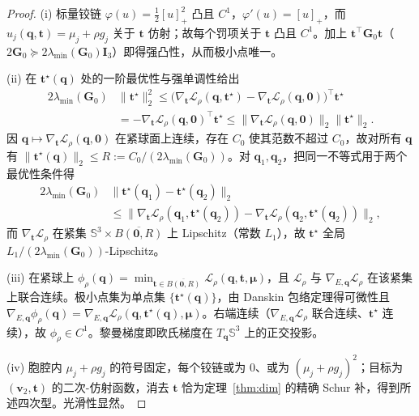 \begin{proof}
(i) 标量铰链 $\varphi(u)=\tfrac12[u]_+^2$ 凸且 $C^1$，$\varphi'(u)=[u]_+$，而 $u_j(\mathbf q,\mathbf t)=\mu_j+\rho g_j$ 关于 $\mathbf t$ 仿射；故每个罚项关于 $\mathbf t$ 凸且 $C^1$。加上 $\mathbf t^\top\mathbf G_0\mathbf t$（$2\mathbf G_0\succeq2\lambda_{\min}(\mathbf G_0)\mathbf I_3$）即得强凸性，从而极小点唯一。

(ii) 在 $\mathbf t^\star(\mathbf q)$ 处的一阶最优性与强单调性给出
\begin{equation}
\begin{aligned}
2\lambda_{\min}(\mathbf G_0)&\|\mathbf t^\star\|_2^2
\le\big(\nabla_{\mathbf t}\mathcal L_\rho(\mathbf q,\mathbf t^\star)-\nabla_{\mathbf t}\mathcal L_\rho(\mathbf q,\mathbf 0)\big)^\top\mathbf t^\star\\
&=-\nabla_{\mathbf t}\mathcal L_\rho(\mathbf q,\mathbf 0)^\top\mathbf t^\star
\le\|\nabla_{\mathbf t}\mathcal L_\rho(\mathbf q,\mathbf 0)\|_2\|\mathbf t^\star\|_2 .
\end{aligned}
\end{equation}
因 $\mathbf q\mapsto\nabla_{\mathbf t}\mathcal L_\rho(\mathbf q,\mathbf 0)$ 在紧球面上连续，存在 $C_0$ 使其范数不超过 $C_0$，故对所有 $\mathbf q$ 有 $\|\mathbf t^\star(\mathbf q)\|_2\le R:=C_0/(2\lambda_{\min}(\mathbf G_0))$。对 $\mathbf q_1,\mathbf q_2$，把同一不等式用于两个最优性条件得
\begin{equation}
\begin{aligned}
2\lambda_{\min}(\mathbf G_0)&\|\mathbf t^\star(\mathbf q_1)-\mathbf t^\star(\mathbf q_2)\|_2\\
&\le\|\nabla_{\mathbf t}\mathcal L_\rho(\mathbf q_1,\mathbf t^\star(\mathbf q_2))
-\nabla_{\mathbf t}\mathcal L_\rho(\mathbf q_2,\mathbf t^\star(\mathbf q_2))\|_2 ,
\end{aligned}
\end{equation}
而 $\nabla_{\mathbf t}\mathcal L_\rho$ 在紧集 $\mathbb S^3\times\overline{B(\mathbf 0,R)}$ 上 Lipschitz（常数 $L_1$），故 $\mathbf t^\star$ 全局 $L_1/(2\lambda_{\min}(\mathbf G_0))$-Lipschitz。

(iii) 在紧球上 $\phi_\rho(\mathbf q)=\min_{\mathbf t\in\overline{B(\mathbf 0,R)}}\mathcal L_\rho(\mathbf q,\mathbf t,\boldsymbol\mu)$，且 $\mathcal L_\rho$ 与 $\nabla_{E,\mathbf q}\mathcal L_\rho$ 在该紧集上联合连续。极小点集为单点集 $\{\mathbf t^\star(\mathbf q)\}$，由 Danskin 包络定理得可微性且 $\nabla_{E,\mathbf q}\phi_\rho(\mathbf q)=\nabla_{E,\mathbf q}\mathcal L_\rho(\mathbf q,\mathbf t^\star(\mathbf q),\boldsymbol\mu)$。右端连续（$\nabla_{E,\mathbf q}\mathcal L_\rho$ 联合连续、$\mathbf t^\star$ 连续），故 $\phi_\rho\in C^1$。黎曼梯度即欧氏梯度在 $T_{\mathbf q}\mathbb S^3$ 上的正交投影。

(iv) 胞腔内 $\mu_j+\rho g_j$ 的符号固定，每个铰链或为 $0$、或为 $(\mu_j+\rho g_j)^2$；目标为 $(\mathbf v_2,\mathbf t)$ 的二次-仿射函数，消去 $\mathbf t$ 恰为定理~\ref{thm:dim} 的精确 Schur 补，得到所述四次型。光滑性显然。
\end{proof}

